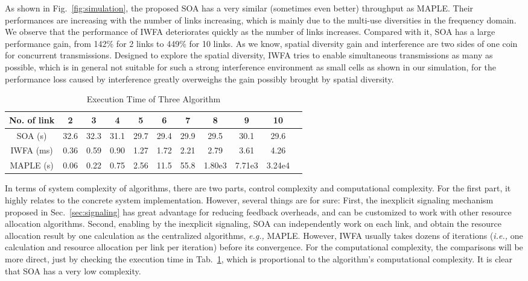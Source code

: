 \documentclass[conference]{IEEEtran}
\newcommand{\ie}{\emph{i.e., }}
\newcommand{\eg}{\emph{e.g., }}
\begin{document}
As shown in Fig.~\ref{fig:simulation}, the proposed SOA has a very similar (sometimes even better) throughput as MAPLE. Their performances are increasing with the number of links increasing, which  is mainly due to the multi-use diversities in the frequency domain. We observe that the performance of IWFA deteriorates quickly as the number of links increases. Compared with it, SOA has a large performance gain, from 142\% for 2 links to 449\% for 10 links. As we know, spatial diversity gain and interference are two sides of one coin for concurrent transmissions. Designed to explore the spatial diversity, IWFA tries to enable simultaneous transmissions as many as possible, which is in general not suitable for such a strong interference environment as small cells as shown in our simulation, for the performance loss caused by interference greatly overweighs the gain possibly brought by spatial diversity. 

\begin{table}[tb]
\centering
\begin{tabular}{|c|c|c|c|c|c|c|c|c|c|c|}
\hline
No. of link& 2&3&4&5&6&7&8&9&10\\
\hline
SOA (s)&32.6&32.3&31.1&29.7&29.4&29.9&29.5&30.1&29.6\\
\hline
IWFA (ms)&0.36&0.59&0.90&1.27&1.72&2.21&2.79&3.61&4.26\\
\hline
MAPLE (s)&0.06&0.22&0.75&2.56&11.5&55.8&1.80e3&7.71e3&3.24e4\\
\hline
\end{tabular}
\caption{Execution Time of Three Algorithm}
\label{tab:time}
\end{table}

In terms of system complexity of algorithms, there are two parts, control complexity and computational complexity. For the first part, it highly relates to the concrete system implementation. However, several things are for sure: First, the inexplicit signaling mechanism proposed in Sec.~\ref{sec:signaling} has great advantage for reducing feedback overheads, and can be customized to work with other resource allocation algorithms. Second, enabling by the inexplicit signaling, SOA can independently work on each link, and obtain the resource allocation result by one calculation as the centralized algorithms, \eg MAPLE. However, IWFA usually takes dozens of iterations (\ie one calculation and resource allocation per link per iteration) before its convergence. For the computational complexity, the comparisons will be more direct, just by checking the execution time in Tab.~\ref{tab:time}, which is proportional to the algorithm's computational complexity. It is clear that SOA has a very low complexity.
\end{document}
